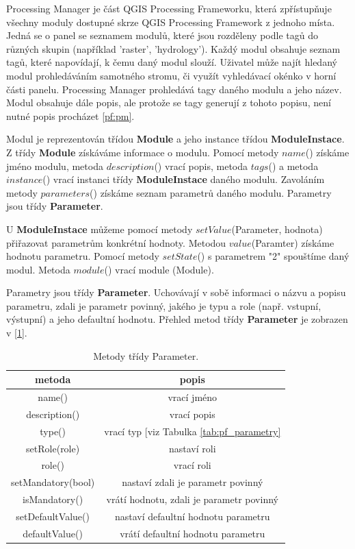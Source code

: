 Processing Manager je část QGIS Processing Frameworku, která
zpřístupňuje všechny moduly dostupné skrze QGIS Processing Framework z
jednoho místa. Jedná se o panel se seznamem modulů, které jsou
rozděleny podle tagů do různých skupin (například 'raster',
'hydrology'). Každý modul obsahuje seznam tagů, které napovídají, k
čemu daný modul slouží. Uživatel může najít hledaný modul
prohledáváním samotného stromu, či využít vyhledávací okénko v horní
části panelu. Processing Manager prohledává tagy daného modulu a jeho
název. Modul obsahuje dále popis, ale protože se tagy generují z
tohoto popisu, není nutné popis procházet \figurename \ref{pf:pm}.

Modul je reprezentován třídou \textbf{Module} a jeho instance
třídou \textbf{ModuleInstace}. Z třídy \textbf{Module} získáváme
informace o modulu. Pomocí metody $name$() získáme jméno modulu,
metoda $description$() vrací popis, metoda $tags$() a metoda
$instance$() vrací instanci třídy \textbf{ModuleInstace} daného
modulu. Zavoláním metody $parameters$() získáme seznam parametrů
daného modulu. Parametry jsou třídy \textbf{Parameter}.

U \textbf{ModuleInstace} můžeme pomocí metody $setValue$(Parameter,
hodnota) přiřazovat parametrům konkrétní hodnoty. Metodou
$value$(Paramter) získáme hodnotu parametru. Pomocí metody
$setState$() s parametrem "2" spouštíme daný modul. Metoda $module$()
vrací module (Module).

Parametry jsou třídy \textbf{Parameter}. Uchovávají v sobě informaci o
názvu a popisu parametru, zdali je parametr povinný, jakého je typu a
role (např. vstupní, výstupní) a jeho defaultní hodnotu. Přehled metod
třídy \textbf{Parameter} je zobrazen v [\tablename \ref{tab:metPar}].

\begin{table}[!]
	\centering
	\begin{tabular}{|c|c|}
	\hline
	metoda & popis \\
	\hline
	\hline
	name() & vrací jméno\\
	description() & vrací popis\\
	type() & vrací typ [viz Tabulka \ref{tab:pf_parametry} \\
	setRole(role) & nastaví roli\\
	role() & vrací roli\\
	setMandatory(bool) & nastaví zdali je parametr povinný\\
	isMandatory() & vrátí hodnotu, zdali je parametr povinný\\
	setDefaultValue() & nastaví defaultní hodnotu parametru\\
	defaultValue() & vrátí defaultní hodnotu parametru \\
	\hline
	\end{tabular}
	\caption{Metody třídy Parameter.}
	\label{tab:metPar}
\end{table}

